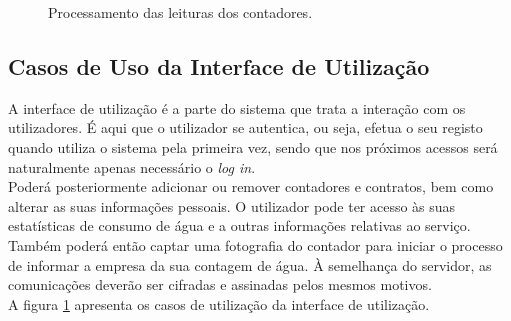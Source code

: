\vspace{2cm}%

\begin{figure}[h!]
\begin{center}
\caption{Processamento das leituras dos contadores.}
\label{fig:state_processamento}
\end{center}
\end{figure}


\subsection{Casos de Uso da Interface de Utilização}
A interface de utilização é a parte do sistema que trata a interação com os utilizadores. É aqui que o utilizador se autentica, ou seja, efetua o seu registo quando utiliza o sistema pela primeira vez, sendo que nos próximos acessos será naturalmente apenas necessário o {\textit{log in}}.\\
Poderá posteriormente adicionar ou remover contadores e contratos, bem como alterar as suas informações pessoais. O utilizador pode ter acesso às suas estatísticas de consumo de água e a outras informações relativas ao serviço.\\
Também poderá então captar uma fotografia do contador para iniciar o processo de informar a empresa da sua contagem de água. À semelhança do servidor, as comunicações deverão ser cifradas e assinadas pelos mesmos motivos.\\
A figura \ref{fig:state_processamento} apresenta os casos de utilização da interface de utilização.

